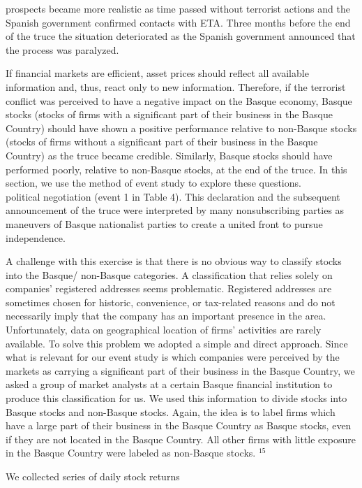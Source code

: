 \documentclass[10pt]{article}
\begin{document}
prospects became more realistic as time passed without terrorist actions and the Spanish government confirmed contacts with ETA. Three months before the end of the truce the situation deteriorated as the Spanish government announced that the process was paralyzed.

If financial markets are efficient, asset prices should reflect all available information and, thus, react only to new information. Therefore, if the terrorist conflict was perceived to have a negative impact on the Basque economy, Basque stocks (stocks of firms with a significant part of their business in the Basque Country) should have shown a positive performance relative to non-Basque stocks (stocks of firms without a significant part of their business in the Basque Country) as the truce became credible. Similarly, Basque stocks should have performed poorly, relative to non-Basque stocks, at the end of the truce. In this section, we use the method of event study to explore these questions.\\
political negotiation (event 1 in Table 4). This declaration and the subsequent announcement of the truce were interpreted by many nonsubscribing parties as maneuvers of Basque nationalist parties to create a united front to pursue independence.

A challenge with this exercise is that there is no obvious way to classify stocks into the Basque/ non-Basque categories. A classification that relies solely on companies' registered addresses seems problematic. Registered addresses are sometimes chosen for historic, convenience, or tax-related reasons and do not necessarily imply that the company has an important presence in the area. Unfortunately, data on geographical location of firms' activities are rarely available. To solve this problem we adopted a simple and direct approach. Since what is relevant for our event study is which companies were perceived by the markets as carrying a significant part of their business in the Basque Country, we asked a group of market analysts at a certain Basque financial institution to produce this classification for us. We used this information to divide stocks into Basque stocks and non-Basque stocks. Again, the idea is to label firms which have a large part of their business in the Basque Country as Basque stocks, even if they are not located in the Basque Country. All other firms with little exposure in the Basque Country were labeled as non-Basque stocks. ${ }^{15}$

We collected series of daily stock returns
\end{document}
